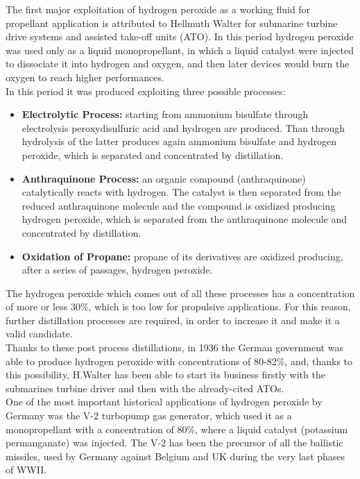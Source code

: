 \documentclass[a4paper]{report}
\begin{document}
The first major exploitation of hydrogen peroxide as a working fluid for propellant application is attributed to Hellmuth Walter for submarine turbine drive systems and assisted take-off units (ATO). In this period hydrogen peroxide was used only as a liquid monopropellant, in which a liquid catalyst were injected to dissociate it into hydrogen and oxygen, and then later devices would burn the oxygen to reach higher performances. \\ 
In this period it was produced exploiting three possible processes: 
\begin{itemize}
\item \textbf{Electrolytic Process:} starting from ammonium bisulfate through electrolysis peroxydisulfuric acid and hydrogen are produced. Than through hydrolysis of the latter produces again ammonium bisulfate and hydrogen peroxide, which is separated and concentrated by distillation.
\item \textbf{Anthraquinone Process:} an organic compound (anthraquinone) catalytically reacts with hydrogen. The catalyst is then separated from the reduced anthraquinone molecule and the compound is oxidized producing hydrogen peroxide, which is separated from the anthraquinone molecule and concentrated by distillation.  
\item \textbf{Oxidation of Propane:} propane of its derivatives are oxidized producing, after a series of passages, hydrogen peroxide.
\end{itemize}

The hydrogen peroxide which comes out of all these processes has a concentration of more or less 30\%, which is too low for propulsive applications. For this reason, further distillation processes are required, in order to increase it and make it a valid candidate. \\
Thanks to these post process distillations, in 1936 the German government was able to produce hydrogen peroxide with concentrations of 80-82\%, and, thanks to this possibility, H.Walter has been able to start its business firstly with the submarines turbine driver and then with the already-cited ATOs. \\
One of the most important historical applications of hydrogen peroxide by Germany was the V-2 turbopump gas generator, which used it as a monopropellant with a concentration of 80\%, where a liquid catalyst (potassium permanganate) was injected. The V-2 has been the precursor of all the ballistic missiles, used by Germany against Belgium and UK during the very last phases of WWII.\\
\end{document}
